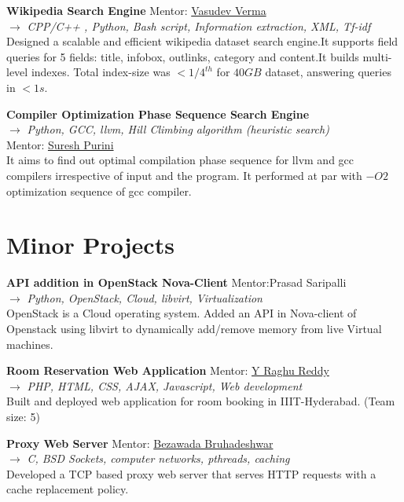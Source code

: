 \documentclass[margin]{res}
\begin{document}
\begin{resume}
{\bf Wikipedia Search Engine} \hfill{Mentor: \href{http://faculty.iiit.ac.in/~vv/Home.html}{Vasudev Verma}} \\
$\rightarrow$ {\it CPP/C++ , Python, Bash script, Information extraction, XML, Tf-idf } \\
Designed a scalable and efficient wikipedia dataset search engine.It supports field queries for 5 fields: title, infobox, outlinks, category and content.It builds multi-level indexes. Total index-size was $< 1/4^{th}$ for $40 GB$ dataset, answering queries in $ < 1s$. 

{\bf Compiler Optimization Phase Sequence Search Engine} \\
$\rightarrow$ {\it Python, GCC, llvm, Hill Climbing algorithm (heuristic search) } \\
{ Mentor: \href{http://iiit.ac.in/people/faculty/psuresh}{Suresh Purini}} \\
It aims to find out optimal compilation phase sequence for llvm and gcc compilers irrespective of input and the program. It performed at par with $-O2$ optimization sequence of gcc compiler.  



\section{Minor Projects}
{\bf API addition in OpenStack Nova-Client} \hfill{Mentor:Prasad Saripalli} \\
$\rightarrow$ {\it Python, OpenStack, Cloud,  libvirt, Virtualization } \\
OpenStack is a Cloud operating system. Added an API in Nova-client of Openstack using libvirt to dynamically add/remove memory from live Virtual machines.

{\bf Room Reservation Web Application} \hfill{Mentor: \href{http://faculty.iiit.ac.in/~raghu.reddy/Home.html}{Y Raghu Reddy}} \\ 
$\rightarrow$ {\it PHP, HTML, CSS, AJAX, Javascript, Web development } \\
Built and deployed web application for room booking in IIIT-Hyderabad. \hfill{(Team size: 5)}

{\bf Proxy Web Server} \hfill{Mentor: \href{http://iiit.ac.in/people/faculty/bezawada}{Bezawada Bruhadeshwar}} \\ 
$\rightarrow$ {\it C, BSD Sockets, computer networks, pthreads, caching} \\
Developed a TCP based proxy web server that serves HTTP requests with a cache replacement policy.





\end{resume}
\end{document}
